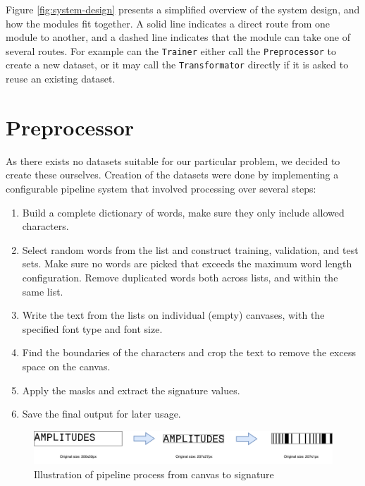 Figure \ref{fig:system-design} presents a simplified overview of the system design, and how the modules fit together. A solid line indicates a direct route from one module to another, and a dashed line indicates that the module can take one of several routes. For example can the {\tt Trainer} either call the {\tt Preprocessor} to create a new dataset, or it may call the {\tt Transformator} directly if it is asked to reuse an existing dataset.


\section{Preprocessor}
\label{sec:preprocessor}
As there exists no datasets suitable for our particular problem, we decided to create these ourselves. Creation of the datasets were done by implementing a configurable pipeline system that involved processing over several steps:

\begin{enumerate}
    \item Build a complete dictionary of words, make sure they only include allowed characters.
    \item Select random words from the list and construct training, validation, and test sets. Make sure no words are picked that exceeds the maximum word length configuration. Remove duplicated words both across lists, and within the same list.
    \item Write the text from the lists on individual (empty) canvases, with the specified font type and font size.
    \item Find the boundaries of the characters and crop the text to remove the excess space on the canvas.
    \item Apply the masks and extract the signature values.
    \item Save the final output for later usage.
\end{enumerate}

\begin{figure}[H]
    \centering
    \includegraphics[width=1\textwidth]{fig/development_process/pipeline.png}
    \caption{Illustration of pipeline process from canvas to signature}
    \label{fig:development-pipeline}
\end{figure}


